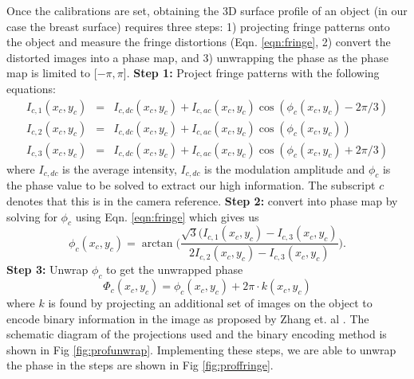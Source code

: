 Once the calibrations are set, obtaining the 3D surface profile of an object (in our case the breast surface) requires three steps: 1) projecting fringe patterns onto the object and measure the fringe distortions (Eqn. \ref{eqn:fringe}, 2) convert the distorted images into a phase map, and 3) unwrapping the phase as the phase map is limited to [$-\pi, \pi$].
\noindent
{\bf Step 1:} Project fringe patterns with the following equations:
\begin{eqnarray}
\label{eqn:fringe}
I_{c,1}(x_c,y_c) & = & I_{c,dc}(x_c,y_c)+I_{c,ac}(x_c,y_c)\cos(\phi_c(x_c,y_c)-2\pi/3)\nonumber \\
I_{c,2}(x_c,y_c) & = & I_{c,dc}(x_c,y_c)+I_{c,ac}(x_c,y_c)\cos(\phi_c(x_c,y_c))\nonumber\\
I_{c,3}(x_c,y_c) & = & I_{c,dc}(x_c,y_c)+I_{c,ac}(x_c,y_c)\cos(\phi_c(x_c,y_c)+2\pi/3)
\end{eqnarray}
\noindent
where $I_{c,dc}$ is the average intensity, $I_{c,dc}$ is the modulation amplitude and $\phi_c$ is the phase value to be solved to extract our high information. The subscript $c$ denotes that this is in the camera reference.
\noindent
{\bf Step 2:} convert into phase map by solving for $\phi_c$ using Eqn. \ref{eqn:fringe} which gives us
\begin{equation}
\phi_c(x_c,y_c)=\arctan\big(\frac{\sqrt{3}(I_{c,1}(x_c,y_c)-I_{c,3}(x_c,y_c)}{2I_{c,2}(x_c,y_c)-I_{c,3}(x_c,y_c)}\big).
\end{equation}
\noindent
{\bf Step 3:} Unwrap $\phi_c$ to get the unwrapped phase
\begin{equation}
\Phi_c(x_c,y_c)= \phi_c(x_c,y_c)+2\pi\cdot k(x_c,y_c)
\end{equation}
where $k$ is found by projecting an additional set of images on the object to encode binary information in the image as proposed by Zhang et. al \cite{Zhang2006}. The schematic diagram of the projections used and the binary encoding method is shown in Fig \ref{fig:profunwrap}. Implementing these steps, we are able to unwrap the phase in the steps are shown in Fig \ref{fig:proffringe}.
